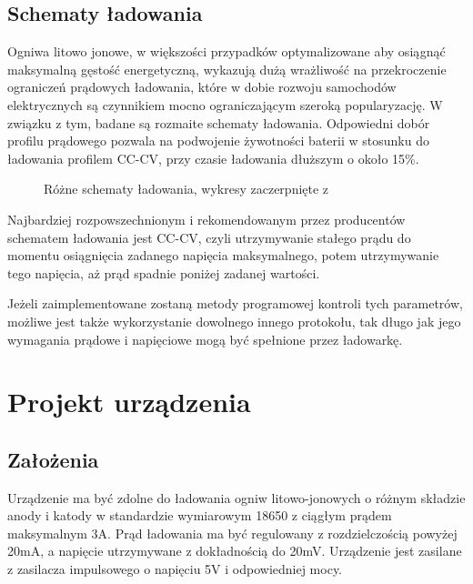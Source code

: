 \documentclass[polish,engineer]{polsl-msth}
\begin{document}
\section{Schematy ładowania}
Ogniwa litowo jonowe, w większości przypadków optymalizowane aby osiągnąć maksymalną gęstość energetyczną, wykazują dużą wrażliwość na przekroczenie ograniczeń prądowych ładowania\cite{TOMASZEWSKA2019100011}, które w dobie rozwoju samochodów elektrycznych są czynnikiem mocno ograniczającym szeroką popularyzację. W związku z tym, badane są rozmaite schematy ładowania. Odpowiedni dobór profilu prądowego pozwala na podwojenie żywotności baterii w stosunku do ładowania profilem CC-CV, przy czasie ładowania dłuższym o około 15\%\cite{SCHINDLER2018364}.
\begin{figure}[hbtp]
     \caption{Różne schematy ładowania, wykresy zaczerpnięte z \cite{TOMASZEWSKA2019100011}\label{img:charging_protocols}}
\end{figure}

Najbardziej rozpowszechnionym i rekomendowanym przez producentów schematem ładowania jest CC-CV, czyli utrzymywanie stałego prądu do momentu osiągnięcia zadanego napięcia maksymalnego, potem utrzymywanie tego napięcia, aż prąd spadnie poniżej zadanej wartości.

Jeżeli zaimplementowane zostaną metody programowej kontroli tych parametrów, możliwe jest także wykorzystanie dowolnego innego protokołu, tak długo jak jego wymagania prądowe i napięciowe mogą być spełnione przez ładowarkę.


\chapter{Projekt urządzenia}
\section{Założenia}
Urządzenie ma być zdolne do ładowania ogniw litowo-jonowych o różnym składzie anody i katody w standardzie wymiarowym 18650 z ciągłym prądem maksymalnym 3A. Prąd ładowania ma być regulowany z rozdzielczością powyżej 20mA, a napięcie utrzymywane z dokładnością do 20mV. Urządzenie jest zasilane z zasilacza impulsowego o napięciu 5V i odpowiedniej mocy.
\end{document}
